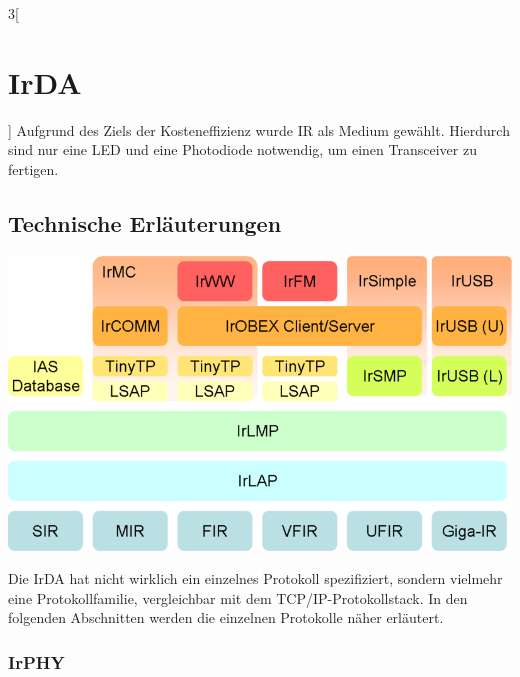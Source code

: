 \begin{multicols}{3}[\section{IrDA}]
Aufgrund des Ziels der Kosteneffizienz wurde IR als Medium gewählt. Hierdurch sind nur eine LED und eine Photodiode notwendig, um einen Transceiver zu fertigen.~\cite{hparticle}

\subsection*{Technische Erläuterungen}
\begin{Figure}
\includegraphics[width=\linewidth]{Kapitel/IrDA/Grafiken/protocol_stack.png}
\label{fig:irda.stack}
\end{Figure}
Die IrDA hat nicht wirklich ein einzelnes Protokoll spezifiziert, sondern vielmehr eine Protokollfamilie, vergleichbar mit dem TCP/IP-Protokollstack. In den folgenden Abschnitten werden die einzelnen Protokolle näher erläutert.
\subsubsection*{IrPHY}


\end{multicols}
